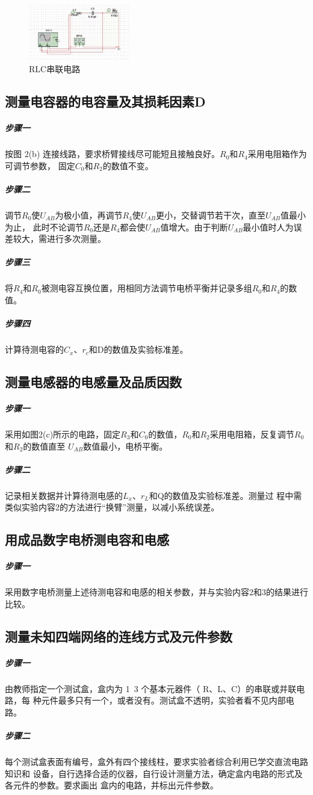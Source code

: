 \documentclass[10pt,a4paper,twocolumn,twoside,UTF8]{ctexart}
\begin{document}
	\begin{figure}[!h]
		\centering
		\includegraphics[width=0.4\textwidth]{img//RLC.jpg}
		\caption{RLC串联电路}
		\label{fig:3}
	\end{figure}

	\subsection{测量电容器的电容量及其损耗因素D}
    \subparagraph{步骤一}按图 2(b) 连接线路，要求桥臂接线尽可能短且接触良好。$R_0$和$R_4$采用电阻箱作为可调节参数，
固定$C_0$和$R_2$的数值不变。
    \subparagraph{步骤二}调节$R_0$使$U_{AB}$为极小值，再调节$R_4$使$U_{AB}$更小，交替调节若干次，直至$U_{AB}$值最小为止，
此时不论调节$R_0$还是$R_4$都会使$U_{AB}$值增大。由于判断$U_{AB}$最小值时人为误差较大，需进行多次测量。
    \subparagraph{步骤三}将$R_4$和$R_0$被测电容互换位置，用相同方法调节电桥平衡并记录多组$R_0$和$R_4$的数值。
    \subparagraph{步骤四}计算待测电容的$C_x$、$r_c$和D的数值及实验标准差。

    \subsection{测量电感器的电感量及品质因数}
    \subparagraph{步骤一}采用如图2(c)所示的电路，固定$R_3$和$C_0$的数值，$R_0$和$R_2$采用电阻箱，反复调节$R_0$和$R_2$的数值直至
$U_{AB}$数值最小，电桥平衡。
\subparagraph{步骤二}记录相关数据并计算待测电感的$L_x$、$r_L$和Q的数值及实验标准差。测量过
程中需类似实验内容2的方法进行“换臂”测量，以减小系统误差。
    
    \subsection{用成品数字电桥测电容和电感}
	\subparagraph{步骤一}采用数字电桥测量上述待测电容和电感的相关参数，并与实验内容2和3的结果进行比较。

	\subsection{测量未知四端网络的连线方式及元件参数}
	\subparagraph{步骤一}由教师指定一个测试盒，盒内为 1~3 个基本元器件（ R、L、C）的串联或并联电路，每
种元件最多只有一个，或者没有。测试盒不透明，实验者看不见内部电路。
    \subparagraph{步骤二}每个测试盒表面有编号，盒外有四个接线柱，要求实验者综合利用已学交直流电路知识和
设备，自行选择合适的仪器，自行设计测量方法，确定盒内电路的形式及各元件的参数。要求画出
盒内的电路，并标出元件参数。
\end{document}
